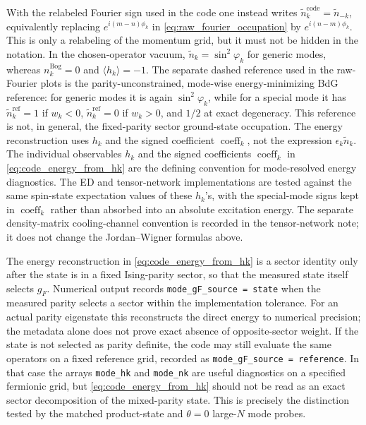 \documentclass[aps,prx,twocolumn,superscriptaddress,nofootinbib,nolongbibliography,nobalancelastpage,10pt,floatfix]{revtex4-2}
\begin{document}
With the relabeled Fourier sign used in the code one instead writes
\(\tilde n_k^{\mathrm{code}}=\tilde n_{-k}\), equivalently replacing
\(e^{i(m-n)\phi_k}\) in \cref{eq:raw_fourier_occupation} by
\(e^{i(n-m)\phi_k}\).  This is only a relabeling of the momentum grid, but it
must not be hidden in the notation.  In the chosen-operator vacuum,
\(\tilde n_k=\sin^2\varphi_k\) for generic modes, whereas
\(n_k^{\mathrm{Bog}}=0\) and \(\langle h_k\rangle=-1\).
The separate dashed reference used in the raw-Fourier plots is the
parity-unconstrained, mode-wise energy-minimizing BdG reference:
for generic modes it is again \(\sin^2\varphi_k\), while for a special mode
it has \(\tilde n_k^{\mathrm{ref}}=1\) if \(w_k<0\),
\(\tilde n_k^{\mathrm{ref}}=0\) if \(w_k>0\), and \(1/2\) at exact
degeneracy.  This reference is not, in general, the fixed-parity sector
ground-state occupation.
The energy reconstruction uses \(h_k\) and the signed coefficient
\(\operatorname{coeff}_k\), not the expression \(\epsilon_k\tilde n_k\).
The individual observables \(h_k\) and the signed coefficients
\(\operatorname{coeff}_k\) in \cref{eq:code_energy_from_hk} are the defining
convention for mode-resolved energy diagnostics. The ED and tensor-network
implementations are tested against the same spin-state expectation values of
these \(h_k\)'s, with the special-mode signs kept in
\(\operatorname{coeff}_k\) rather than absorbed into an absolute excitation
energy. The separate density-matrix cooling-channel convention is recorded in
the tensor-network note; it does not change the Jordan--Wigner formulas above.

The energy reconstruction in \cref{eq:code_energy_from_hk} is a sector
identity only after the state is in a fixed Ising-parity sector, so that the
measured state itself selects \(g_F\).  Numerical output records
\texttt{mode\_gF\_source = state} when the measured parity selects a sector
within the implementation tolerance.  For an actual parity eigenstate this
reconstructs the direct energy to numerical precision; the metadata alone does
not prove exact absence of opposite-sector weight.  If the state is not selected
as parity definite, the code may still evaluate the same operators on a fixed
reference grid, recorded as \texttt{mode\_gF\_source = reference}.  In that case
the arrays \texttt{mode\_hk} and \texttt{mode\_nk} are useful diagnostics on a
specified fermionic grid, but \cref{eq:code_energy_from_hk} should not be read
as an exact sector decomposition of the mixed-parity state.  This is precisely
the distinction tested by the matched product-state and \(\theta=0\)
large-\(N\) mode probes.
\end{document}
